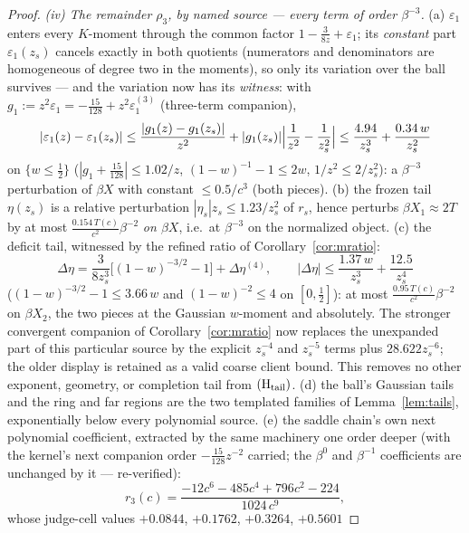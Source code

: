 \documentclass[11pt]{article}
\theoremstyle{remark}
\begin{document}
\begin{proof}
\emph{(iv) The remainder $\rho_3$, by named source --- every term
of order $\beta^{-3}$.} \textup{(a)} $\varepsilon_1$ enters every
$K$-moment through the common factor $1-\tfrac3{8z}+\varepsilon_1$;
its \emph{constant} part $\varepsilon_1(z_s)$ cancels exactly in
both quotients \textup{(}numerators and denominators are
homogeneous of degree two in the moments\textup{)}, so only its
variation over the ball survives --- and the variation now has its
\emph{witness}: with $g_1:=z^2\varepsilon_1=-\tfrac{15}{128}
+z^2\varepsilon_1^{(3)}$ \textup{(}three-term companion\textup{)},
\[
|\varepsilon_1(z)-\varepsilon_1(z_s)|
\le\frac{|g_1(z)-g_1(z_s)|}{z^2}
+|g_1(z_s)|\Bigl|\frac1{z^2}-\frac1{z_s^2}\Bigr|
\le\frac{4.94}{z_s^3}+\frac{0.34\,w}{z_s^2}
\]
on $\{w\le\tfrac12\}$ \textup{(}$|g_1+\tfrac{15}{128}|\le1.02/z$,
$(1-w)^{-1}-1\le2w$, $1/z^2\le2/z_s^2$\textup{)}: a $\beta^{-3}$
perturbation of $\beta X$ with constant $\le0.5/c^3$
\textup{(}both pieces\textup{)}. \textup{(b)} the frozen tail
$\eta(z_s)$ is a relative perturbation $|\eta_s|z_s\le1.23/z_s^2$
of $r_s$, hence perturbs $\beta X_1\approx2T$ by at most
$\tfrac{0.154\,T(c)}{c^2}\beta^{-2}$ \emph{on $\beta X$}, i.e.\ at
$\beta^{-3}$ on the normalized object. \textup{(c)} the deficit
tail, witnessed by the refined ratio of
Corollary~\ref{cor:mratio}:
\[
\Delta\eta=\frac{3}{8z_s^3}\bigl[(1-w)^{-3/2}-1\bigr]
+\Delta\eta^{(4)},\qquad
|\Delta\eta|\le\frac{1.37\,w}{z_s^3}+\frac{12.5}{z_s^4}
\]
\textup{(}$(1-w)^{-3/2}-1\le3.66\,w$ and $(1-w)^{-2}\le4$ on
$[0,\tfrac12]$\textup{)}: at most
$\tfrac{0.95\,T(c)}{c^2}\beta^{-2}$ on $\beta X_2$, the two pieces
at the Gaussian $w$-moment and absolutely.  The stronger convergent
companion of Corollary~\ref{cor:mratio} now replaces the unexpanded
part of this particular source by the explicit $z_s^{-4}$ and
$z_s^{-5}$ terms plus $28.622z_s^{-6}$; the older display is retained
as a valid coarse client bound.  This removes no other exponent,
geometry, or completion tail from $(\mathrm H_{\rm tail})$.
\textup{(d)} the ball's Gaussian tails and the ring
and far regions are the two templated families of
Lemma~\ref{lem:tails}, exponentially below every polynomial
source. \textup{(e)} the saddle chain's own next polynomial
coefficient, extracted by the same machinery one order deeper
\textup{(}with the kernel's next companion order
$-\tfrac{15}{128}z^{-2}$ carried; the $\beta^0$ and $\beta^{-1}$
coefficients are unchanged by it --- re-verified\textup{)}:
\[
r_3(c)=\frac{-12c^6-485c^4+796c^2-224}{1024\,c^{9}} ,
\]
whose judge-cell values $+0.0844$, $+0.1762$, $+0.3264$, $+0.5601$

\end{proof}
\end{document}
